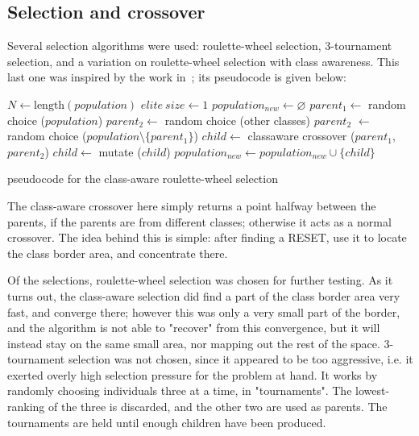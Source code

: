 \documentclass[times, utf8, diplomski]{fer}
\begin{document}
\subsection{Selection and crossover}
Several selection algorithms were used: roulette-wheel selection, 3-tournament
selection, and a variation on roulette-wheel selection with class awareness.
This last one was inspired by the work in~\cite{GlitchItIfYouCan}; its
pseudocode is given below:
\begin{algorithm}
    \small
    \begin{algorithmic}
    \STATE $N \gets \text{length}(population)$
    \STATE $elite\ size \gets 1$
    \STATE $population_{new} \gets \varnothing$
        \STATE $parent_1  \gets$ random choice ($population$)
            \STATE $parent_2 \gets$ random choice (other classes)
        \ELSE
            \STATE $parent_2$ $\gets$ random choice ($population \setminus \{parent_1\}$)
        \ENDIF
        \STATE $child \gets$ classaware crossover ($parent_1$, $parent_2$)
        \STATE $child \gets$ mutate ($child$)
        \STATE $population_{new} \gets population_{new} \cup \{child\} $
    \ENDFOR
    \end{algorithmic}
    \caption{pseudocode for the class-aware roulette-wheel selection}
\end{algorithm}

The class-aware crossover here simply returns a point halfway between the parents,
if the parents are from different classes; otherwise it acts as a normal crossover.
The idea behind this is simple: after finding a RESET, use it to locate the class
border area, and concentrate there.

Of the selections, roulette-wheel selection was chosen for further testing.
As it turns out, the class-aware selection did find a part of the class border
area very fast, and converge there; however this was only a very small part of
the border, and the algorithm is not able to "recover" from this convergence,
but it will instead stay on the same small area, nor mapping out the rest of
the space.
3-tournament selection was not chosen, since it appeared to be too aggressive,
i.e. it exerted overly high selection pressure for the problem at hand.
It works by randomly choosing individuals three at a time, in "tournaments".
The lowest-ranking of the three is discarded, and the other two are used as
parents. The tournaments are held until enough children have been produced.
\end{document}
